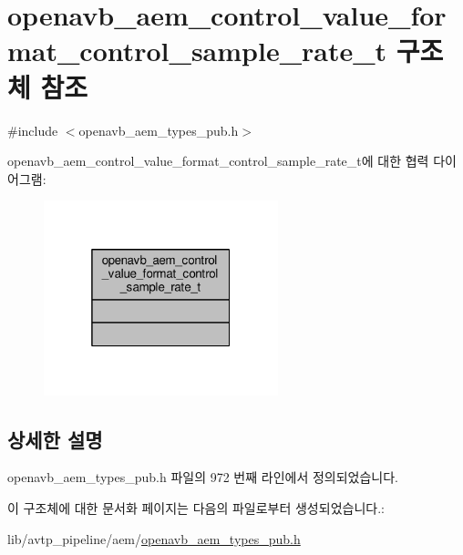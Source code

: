 \hypertarget{structopenavb__aem__control__value__format__control__sample__rate__t}{}\section{openavb\+\_\+aem\+\_\+control\+\_\+value\+\_\+format\+\_\+control\+\_\+sample\+\_\+rate\+\_\+t 구조체 참조}
\label{structopenavb__aem__control__value__format__control__sample__rate__t}


{\ttfamily \#include $<$openavb\+\_\+aem\+\_\+types\+\_\+pub.\+h$>$}



openavb\+\_\+aem\+\_\+control\+\_\+value\+\_\+format\+\_\+control\+\_\+sample\+\_\+rate\+\_\+t에 대한 협력 다이어그램\+:
\nopagebreak
\begin{figure}[H]
\begin{center}
\leavevmode
\includegraphics[width=193pt]{structopenavb__aem__control__value__format__control__sample__rate__t__coll__graph}
\end{center}
\end{figure}


\subsection{상세한 설명}


openavb\+\_\+aem\+\_\+types\+\_\+pub.\+h 파일의 972 번째 라인에서 정의되었습니다.



이 구조체에 대한 문서화 페이지는 다음의 파일로부터 생성되었습니다.\+:\begin{DoxyCompactItemize}
\item 
lib/avtp\+\_\+pipeline/aem/\hyperlink{openavb__aem__types__pub_8h}{openavb\+\_\+aem\+\_\+types\+\_\+pub.\+h}\end{DoxyCompactItemize}
